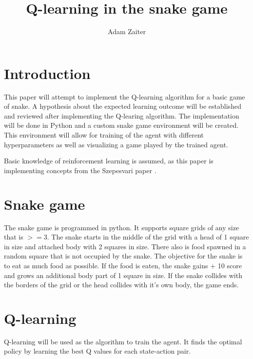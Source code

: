 \documentclass[lettersize,journal]{IEEEtran}
\begin{document}
\title{Q-learning in the snake game}
\author{Adam Zaiter}

\maketitle

\begin{abstract}
\end{abstract}



\section{Introduction}
This paper will attempt to implement the Q-learning algorithm
for a basic game of snake. A hypothesis about the expected learning
outcome will be established and reviewed after implementing the
Q-learing algorithm. The implementation will be done in Python
and a custom snake game environment will be created.
This environment will allow for training of the agent with different
hyperparameters as well as visualizing a game played by the
trained agent.


Basic knowledge of reinforcement learning is assumed, as this paper
is implementing concepts from the Szepesvari paper \cite{szepesvari}.

\section{Snake game}
The snake game is programmed in python.
It supports square grids of any size that is $>= 3$.
The snake starts in the middle of the grid with a head of
1 square in size and attached
body with 2 squares in size. There also is food spawned in a random
square that is not occupied by the snake. The objective for the
snake is to eat as much food as possible. If the food is eaten,
the snake gains + 10 score and grows an additional body part of
1 square in size. If the snake collides with the borders of the grid
or the head collides with it's own body, the game ends.\label{game-over}


\section{Q-learning}
Q-learning will be used as the algorithm to train the agent.
It finds the optimal policy by learning
the best Q values for each state-action pair.
\end{document}
